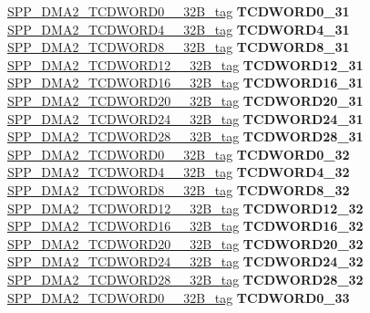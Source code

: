 \begin{DoxyCompactItemize}
\begin{tabbing}
\>\>\mbox{\hyperlink{unionSPP__DMA2__TCDWORD0____32B__tag}{SPP\_DMA2\_TCDWORD0\_\_32B\_tag}} {\bfseries TCDWORD0\_31}\\
\>\>\mbox{\hyperlink{unionSPP__DMA2__TCDWORD4____32B__tag}{SPP\_DMA2\_TCDWORD4\_\_32B\_tag}} {\bfseries TCDWORD4\_31}\\
\>\>\mbox{\hyperlink{unionSPP__DMA2__TCDWORD8____32B__tag}{SPP\_DMA2\_TCDWORD8\_\_32B\_tag}} {\bfseries TCDWORD8\_31}\\
\>\>\mbox{\hyperlink{unionSPP__DMA2__TCDWORD12____32B__tag}{SPP\_DMA2\_TCDWORD12\_\_32B\_tag}} {\bfseries TCDWORD12\_31}\\
\>\>\mbox{\hyperlink{unionSPP__DMA2__TCDWORD16____32B__tag}{SPP\_DMA2\_TCDWORD16\_\_32B\_tag}} {\bfseries TCDWORD16\_31}\\
\>\>\mbox{\hyperlink{unionSPP__DMA2__TCDWORD20____32B__tag}{SPP\_DMA2\_TCDWORD20\_\_32B\_tag}} {\bfseries TCDWORD20\_31}\\
\>\>\mbox{\hyperlink{unionSPP__DMA2__TCDWORD24____32B__tag}{SPP\_DMA2\_TCDWORD24\_\_32B\_tag}} {\bfseries TCDWORD24\_31}\\
\>\>\mbox{\hyperlink{unionSPP__DMA2__TCDWORD28____32B__tag}{SPP\_DMA2\_TCDWORD28\_\_32B\_tag}} {\bfseries TCDWORD28\_31}\\
\>\>\mbox{\hyperlink{unionSPP__DMA2__TCDWORD0____32B__tag}{SPP\_DMA2\_TCDWORD0\_\_32B\_tag}} {\bfseries TCDWORD0\_32}\\
\>\>\mbox{\hyperlink{unionSPP__DMA2__TCDWORD4____32B__tag}{SPP\_DMA2\_TCDWORD4\_\_32B\_tag}} {\bfseries TCDWORD4\_32}\\
\>\>\mbox{\hyperlink{unionSPP__DMA2__TCDWORD8____32B__tag}{SPP\_DMA2\_TCDWORD8\_\_32B\_tag}} {\bfseries TCDWORD8\_32}\\
\>\>\mbox{\hyperlink{unionSPP__DMA2__TCDWORD12____32B__tag}{SPP\_DMA2\_TCDWORD12\_\_32B\_tag}} {\bfseries TCDWORD12\_32}\\
\>\>\mbox{\hyperlink{unionSPP__DMA2__TCDWORD16____32B__tag}{SPP\_DMA2\_TCDWORD16\_\_32B\_tag}} {\bfseries TCDWORD16\_32}\\
\>\>\mbox{\hyperlink{unionSPP__DMA2__TCDWORD20____32B__tag}{SPP\_DMA2\_TCDWORD20\_\_32B\_tag}} {\bfseries TCDWORD20\_32}\\
\>\>\mbox{\hyperlink{unionSPP__DMA2__TCDWORD24____32B__tag}{SPP\_DMA2\_TCDWORD24\_\_32B\_tag}} {\bfseries TCDWORD24\_32}\\
\>\>\mbox{\hyperlink{unionSPP__DMA2__TCDWORD28____32B__tag}{SPP\_DMA2\_TCDWORD28\_\_32B\_tag}} {\bfseries TCDWORD28\_32}\\
\>\>\mbox{\hyperlink{unionSPP__DMA2__TCDWORD0____32B__tag}{SPP\_DMA2\_TCDWORD0\_\_32B\_tag}} {\bfseries TCDWORD0\_33}\\

\end{tabbing}
\end{DoxyCompactItemize}
